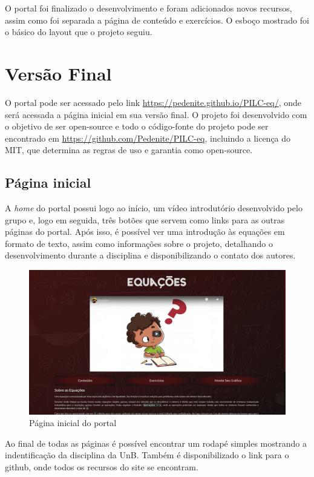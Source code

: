 \documentclass[12pt]{report}
\begin{document}
O portal foi finalizado o desenvolvimento e foram adicionados novos recursos, assim como foi separada a página de conteúdo e exercícios. O esboço mostrado foi o básico do layout que o projeto seguiu.

\chapter{Versão Final}
O portal pode ser acessado pelo link \url{https://pedenite.github.io/PILC-eq/}, onde será acessada a página inicial em sua versão final. O projeto foi desenvolvido com o objetivo de ser open-source e todo o código-fonte do projeto pode ser encontrado em \url{https://github.com/Pedenite/PILC-eq}, incluindo a licença do MIT, que determina as regras de uso e garantia como open-source.

\section{Página inicial}
A \textit{home} do portal possui logo ao início, um vídeo introdutório desenvolvido pelo grupo e, logo em seguida, três botões que servem como links para as outras páginas do portal. Após isso, é possível ver uma introdução às equações em formato de texto, assim como informações sobre o projeto, detalhando o desenvolvimento durante a disciplina e disponibilizando o contato dos autores.

\begin{figure}[H]
    \includegraphics[width=1\textwidth]{img/aplicacao/inicial.png}
    \caption{Página inicial do portal}
\end{figure}

Ao final de todas as páginas é possível encontrar um rodapé simples mostrando a indentificação da disciplina da UnB. Também é disponibilizado o link para o github, onde todos os recursos do site se encontram.
\end{document}
